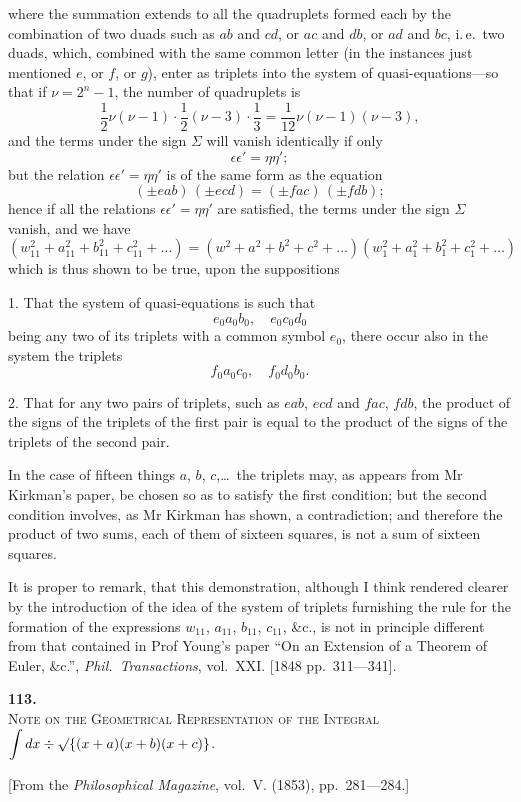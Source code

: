 \documentclass[11pt,a4paper]{book}
\begin{document}
\newpage
\setcounter{page}{52}

where the summation extends to all the quadruplets formed each by the combination of two duads such as $ab$ and $cd$, or $ac$ and $db$, or $ad$ and $bc$, i.\,e.\ two duads, which, combined with the same common letter (in the instances just mentioned $e$, or $f$, or $g$), enter as triplets into the system of quasi-equations---so that if $\nu = 2^n-1$, the number of quadruplets is
\[
\frac{1}{2}\nu(\nu-1)\cdot\frac{1}{2}(\nu-3)\cdot\frac{1}{3}
= \frac{1}{12}\nu(\nu-1)(\nu-3),
\]
and the terms under the sign $\Sigma$ will vanish identically if only
\[
\epsilon\epsilon' = \eta\eta';
\]
but the relation $\epsilon\epsilon' = \eta\eta'$ is of the same form as the equation
\[
(\pm eab)\,(\pm ecd) = (\pm fac)\,(\pm fdb);
\]
hence if all the relations $\epsilon\epsilon' = \eta\eta'$ are satisfied, the terms under the sign $\Sigma$ vanish, and we have
\[
(w_{11}^2 + a_{11}^2 + b_{11}^2 + c_{11}^2 + \ldots)
= (w^2+a^2+b^2+c^2+\ldots)(w_1^2+a_1^2+b_1^2+c_1^2+\ldots)
\]
which is thus shown to be true, upon the suppositions

1. That the system of quasi-equations is such that
\[
e_0 a_0 b_0, \quad e_0 c_0 d_0
\]
being any two of its triplets with a common symbol $e_0$, there occur also in the system the triplets
\[
f_0 a_0 c_0, \quad f_0 d_0 b_0.
\]

2. That for any two pairs of triplets, such as $eab$, $ecd$ and $fac$, $fdb$, the product of the signs of the triplets of the first pair is equal to the product of the signs of the triplets of the second pair.

In the case of fifteen things $a$, $b$, $c$,\ldots\ the triplets may, as appears from Mr Kirkman's paper, be chosen so as to satisfy the first condition; but the second condition involves, as Mr Kirkman has shown, a contradiction; and therefore the product of two sums, each of them of sixteen squares, is not a sum of sixteen squares.

It is proper to remark, that this demonstration, although I think rendered clearer by the introduction of the idea of the system of triplets furnishing the rule for the formation of the expressions $w_{11}$, $a_{11}$, $b_{11}$, $c_{11}$, \&c., is not in principle different from that contained in Prof Young's paper ``On an Extension of a Theorem of Euler, \&c.'', \textit{Phil.\ Transactions}, vol.~XXI. [1848 pp.~311---341].


\newpage
\setcounter{page}{53}

\begin{center}
{\Large\bfseries 113.}\\[0.5em]
{\large\scshape Note on the Geometrical Representation of the Integral $\displaystyle\int dx \div \surd\{(x+a)(x+b)(x+c)\}$.}
\end{center}
\vspace{0.3em}
\begin{center}
\small [From the \textit{Philosophical Magazine}, vol.~V. (1853), pp.~281---284.]
\end{center}
\vspace{0.5em}
\end{document}

